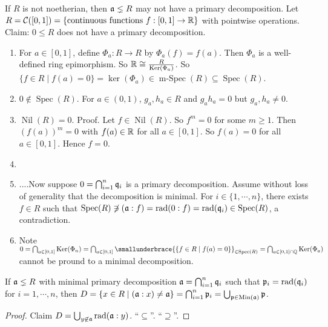 \begin{example}
    If $R$ is not noetherian, then $\mathfrak{a} \lneq R$ may not have a primary decomposition. Let $R = \mathcal{C}([0,1]) = \{\text{continuous functions }f: [0,1] \to \mathbb{R}\}$ with pointwise operations. Claim: $0 \leq R$ does not have a primary decomposition.
    \begin{enumerate}
        \item For $a \in [0,1]$, define $\Phi_a: R \to R$ by $\Phi_a(f) = f(a)$. Then $\Phi_a$ is a well-defined ring epimorphism. So $\mathbb{R} \cong \frac{R}{\operatorname{Ker}(\Phi_a)}$. So $\{f \in R \mid f(a) = 0\} = \ker(\Phi_a) \in \operatorname{m-Spec}(R) \subseteq \operatorname{Spec}(R)$.
        \item $0 \not \in \operatorname{Spec}(R)$. For $a \in (0,1)$, $g_a,h_a \in R$ and $g_ah_a = 0$ but $g_a,h_a \neq 0$.
        \item $\operatorname{Nil}(R) = 0$. Proof. Let $f \in \operatorname{Nil}(R)$. So $f^{m} = 0$ for some $m \geq 1$. Then $(f(a))^{m} = 0$ with $f(a) \in \mathbb{R}$ for all $a \in [0,1]$. So $f(a) = 0$ for all $a \in [0,1]$. Hence $f= 0$.
        \item 
        \item
            ....Now suppose $0 = \bigcap_{i=1}^{n}\mathfrak{q}_i$ is a primary decomposition. Assume without loss of generality that the decomposition is minimal. For $i \in \{1,\cdots,n\}$, there exists $f \in R$ such that $\operatorname{Spec}(R) \not \ni (\mathfrak{a}:f) = \operatorname{rad}(0:f) = \operatorname{rad}(\mathfrak{q}_i) \in \operatorname{Spec}(R)$, a contradiction. 
        \item Note $0 = \bigcap_{a \in [0,1]} \ker(\Phi_n) = \bigcap_{a \in [0,1]} \smallunderbrace{\{f \in R \mid f(a) = 0\}}_{\in \operatorname{Spec}(R)} = \bigcap_{a \in [0,1] \cap \bbQ} \ker(\Phi_a)$ cannot be pround to a minimal decomposition.
    \end{enumerate}
\end{example}

\begin{proposition}
    If $\mathfrak{a} \lneq R$ with minimal primary decomposition $\mathfrak{a} = \bigcap_{i=1}^{n} \mathfrak{q}_i$ such that $\mathfrak{p}_i = \operatorname{rad}(\mathfrak{q}_i)$ for $i = 1,\cdots,n$, then $D = \{x \in R \mid (\mathfrak{a}:x) \neq \mathfrak{a}\} = \bigcap_{i=1}^{n} \mathfrak{p}_i = \bigcup_{\mathfrak{p} \in \operatorname{Min}(\mathfrak{a})} \mathfrak{p}$.
\end{proposition}

\begin{proof}
    Claim $D = \bigcup_{y \not\in \mathfrak{a}} \operatorname{rad}(\mathfrak{a}:y)$. ``$\subseteq$''. ``$\supseteq$''.
\end{proof}

